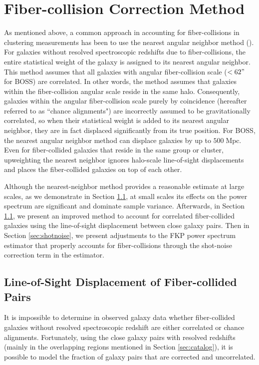 \documentclass{emulateapj}
\begin{document}
\section{Fiber-collision Correction Method} \label{sec:fc_corr}
As mentioned above, a common approach in accounting for fiber-collisions in clustering measurements has been to use the nearest angular neighbor method (\citealt{Zehavi:2002aa, Berlind:2006aa, Anderson:2012aa}). For galaxies without resolved spectroscopic redshifts due to fiber-collisions, the entire statistical weight of the galaxy is assigned to its nearest angular neighbor. This method assumes that all galaxies with angular fiber-collision scale ($< 62 "$ for BOSS) are correlated. In other words, the method assumes that galaxies within the fiber-collision angular scale reside in the same halo. Consequently, galaxies within the angular fiber-collision scale purely by coincidence (hereafter referred to as ``chance alignments") are incorrectly assumed to be gravitationally correlated, so when their statistical weight is added to its nearest angular neighbor, they are in fact displaced significantly from its true position. For BOSS, the nearest angular neighbor method can displace galaxies by up to $500 \;\mathrm{Mpc}$. Even for fiber-collided galaxies that reside in the same group or cluster, upweighting the nearest neighbor ignores halo-scale line-of-sight displacements and places the fiber-collided galaxies on top of each other. 

Although the nearest-neighbor method provides a reasonable estimate at large scales, as we demonstrate in Section \ref{sec:dlos}, at small scales its effects on the power spectrum are significant and dominate sample variance. Afterwards, in Section \ref{sec:dlos}, we present an improved method to account for correlated fiber-collided galaxies using the line-of-sight displacement between close galaxy pairs. Then in Section \ref{sec:shotnoise}, we present adjustments to the FKP power spectrum estimator that properly accounts for fiber-collisions through the shot-noise correction term in the estimator. 

\subsection{Line-of-Sight Displacement of Fiber-collided Pairs} \label{sec:dlos}
It is impossible to determine in observed galaxy data whether fiber-collided galaxies without resolved spectroscopic redshift are either correlated or chance alignments. Fortunately, using the close galaxy pairs with resolved redshifts (mainly in the overlapping regions mentioned in Section \ref{sec:catalog}), it is possible to model the fraction of galaxy pairs that are corrected and uncorrelated. 
\end{document}
